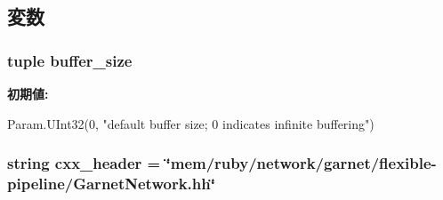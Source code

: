 \subsection{変数}
\hypertarget{classGarnetNetwork_1_1GarnetNetwork_a0f14097399fa367505d7d06197f1498c}{
\subsubsection[{buffer\_\-size}]{\setlength{\rightskip}{0pt plus 5cm}tuple {\bf buffer\_\-size}}}
\label{classGarnetNetwork_1_1GarnetNetwork_a0f14097399fa367505d7d06197f1498c}
{\bfseries 初期値:}
\begin{DoxyCode}
Param.UInt32(0,
        "default buffer size; 0 indicates infinite buffering")
\end{DoxyCode}
\hypertarget{classGarnetNetwork_1_1GarnetNetwork_a17da7064bc5c518791f0c891eff05fda}{
\subsubsection[{cxx\_\-header}]{\setlength{\rightskip}{0pt plus 5cm}string {\bf cxx\_\-header} = \char`\"{}mem/ruby/network/garnet/flexible-\/pipeline/GarnetNetwork.hh\char`\"{}}}
\label{classGarnetNetwork_1_1GarnetNetwork_a17da7064bc5c518791f0c891eff05fda}


